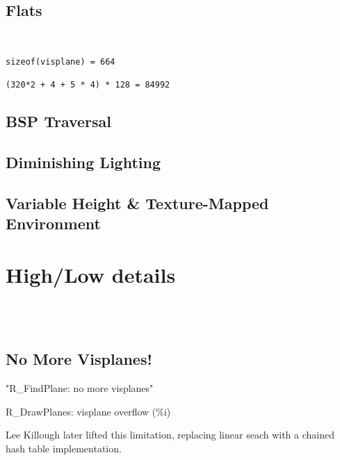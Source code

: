 
\subsection{Flats}
\\
\par
\begin{verbatim}
sizeof(visplane) = 664

(320*2 + 4 + 5 * 4) * 128 = 84992
\end{verbatim}

\subsection{BSP Traversal}

\subsection{Diminishing Lighting}

\subsection{Variable Height \& Texture-Mapped Environment}

\section{High/Low details}

\\
\\


\subsection{No More Visplanes!}
"R\_FindPlane: no more visplanes"\\
\par
R\_DrawPlanes: visplane overflow (\%i)\\
\par

Lee Killough later lifted this limitation, replacing linear seach with a chained hash table implementation.

